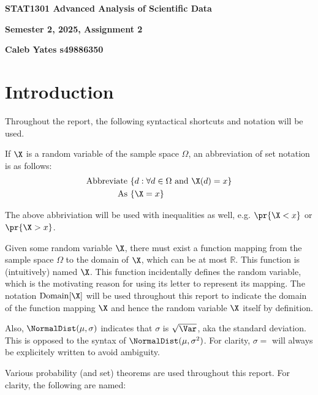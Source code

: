 \begin{center}

{\Large  {\bf STAT1301 Advanced Analysis of Scientific Data}}
\medskip

{\large {\bf Semester 2, 2025, Assignment 2}}

\medskip

{\large {\bf Caleb Yates s49886350}}


\end{center}

\section{Introduction}

Throughout the report, the following syntactical shortcuts and notation will be used.

If $\X$ is a random variable of the sample space $\Omega$, an abbreviation of set notation is as follows:
\begin{align*}
\text{Abbreviate	} & \{ d : \forall d \in \Omega \text{ and } \X(d) = x \} \\
\text{As	} & \{ \X = x \}
\end{align*}

The above abbriviation will be used with inequalities as well, e.g. $\pr{\X < x}$ or $\pr{\X > x}$.

Given some random variable $\X$, there must exist a function mapping from the sample space $\Omega$ to the domain of $\X$,
which can be at most $\mathbb{R}$. This function is (intuitively) named $\X$.
This function incidentally defines the random variable, which is the motivating reason for using its letter to represent its mapping.
The notation $\mathrm{Domain}[\X]$ will be used throughout this report to indicate the domain of the function mapping $\X$ and hence
the random variable $\X$ itself by definition.

Also, $\NormalDist(\mu, \sigma)$ indicates that $\sigma$ is $\sqrt{\Var}$, aka the standard deviation. This is opposed to the syntax of $\NormalDist(\mu, \sigma^2)$. For clarity, $\sigma = $ will always be explicitely written to avoid ambiguity.

Various probability (and set) theorems are used throughout this report. For clarity, the following are named:

